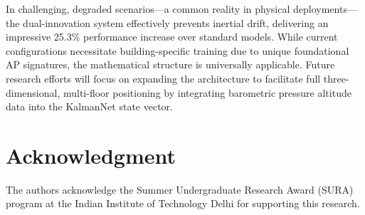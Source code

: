 \documentclass[conference]{IEEEtran}
\begin{document}
In challenging, degraded scenarios—a common reality in physical deployments—the dual-innovation system effectively prevents inertial drift, delivering an impressive 25.3\% performance increase over standard models. While current configurations necessitate building-specific training due to unique foundational AP signatures, the mathematical structure is universally applicable. Future research efforts will focus on expanding the architecture to facilitate full three-dimensional, multi-floor positioning by integrating barometric pressure altitude data into the KalmanNet state vector.

\section*{Acknowledgment}
The authors acknowledge the Summer Undergraduate Research Award (SURA) program at the Indian Institute of Technology Delhi for supporting this research.



\end{document}
